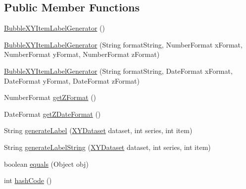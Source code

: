\subsection*{Public Member Functions}
\begin{DoxyCompactItemize}
\item 
\mbox{\hyperlink{classorg_1_1jfree_1_1chart_1_1labels_1_1_bubble_x_y_item_label_generator_ad6d484f9b8fc92c9894e55f46b86aefc}{Bubble\+X\+Y\+Item\+Label\+Generator}} ()
\item 
\mbox{\hyperlink{classorg_1_1jfree_1_1chart_1_1labels_1_1_bubble_x_y_item_label_generator_a0c59a2c6964442e6fcaf16b916611a60}{Bubble\+X\+Y\+Item\+Label\+Generator}} (String format\+String, Number\+Format x\+Format, Number\+Format y\+Format, Number\+Format z\+Format)
\item 
\mbox{\hyperlink{classorg_1_1jfree_1_1chart_1_1labels_1_1_bubble_x_y_item_label_generator_a8f8c863484013dd061d3fd0ca2e54b9c}{Bubble\+X\+Y\+Item\+Label\+Generator}} (String format\+String, Date\+Format x\+Format, Date\+Format y\+Format, Date\+Format z\+Format)
\item 
Number\+Format \mbox{\hyperlink{classorg_1_1jfree_1_1chart_1_1labels_1_1_bubble_x_y_item_label_generator_a8d07862a1dd7c3ceb684eaa07f814ef4}{get\+Z\+Format}} ()
\item 
Date\+Format \mbox{\hyperlink{classorg_1_1jfree_1_1chart_1_1labels_1_1_bubble_x_y_item_label_generator_abaaa1c4af6a6e9898f16d8f33c1a5991}{get\+Z\+Date\+Format}} ()
\item 
String \mbox{\hyperlink{classorg_1_1jfree_1_1chart_1_1labels_1_1_bubble_x_y_item_label_generator_a37b8ec8abc5092193b60e79a8985b257}{generate\+Label}} (\mbox{\hyperlink{interfaceorg_1_1jfree_1_1data_1_1xy_1_1_x_y_dataset}{X\+Y\+Dataset}} dataset, int series, int item)
\item 
String \mbox{\hyperlink{classorg_1_1jfree_1_1chart_1_1labels_1_1_bubble_x_y_item_label_generator_ab7310c0cd305336641952625aef6272b}{generate\+Label\+String}} (\mbox{\hyperlink{interfaceorg_1_1jfree_1_1data_1_1xy_1_1_x_y_dataset}{X\+Y\+Dataset}} dataset, int series, int item)
\item 
boolean \mbox{\hyperlink{classorg_1_1jfree_1_1chart_1_1labels_1_1_bubble_x_y_item_label_generator_ab70da0cdf2d8596b4e409f4c180ff4af}{equals}} (Object obj)
\item 
int \mbox{\hyperlink{classorg_1_1jfree_1_1chart_1_1labels_1_1_bubble_x_y_item_label_generator_aa6d96005df333812f026f2bbeb5772cf}{hash\+Code}} ()
\end{DoxyCompactItemize}
